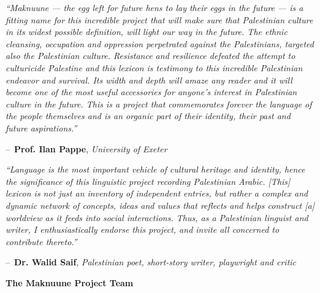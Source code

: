 \documentclass[11pt]{book}
\makeatletter
\newenvironment{chapquote}[2][2em]
  {\setlength{\@tempdima}{#1}%
   \def\chapquote@author{#2}%
   \parshape 1 \@tempdima \dimexpr\textwidth-2\@tempdima\relax%
   \itshape}
  {\par\normalfont\hfill--\ \chapquote@author\hspace*{\@tempdima}\par\bigskip}
\makeatother
\begin{document}
\vspace{5mm}

\begin{chapquote}{\textbf{Prof. Ilan Pappe}, \textit{University of Exeter}}
``Maknuune — the egg left for future hens to lay their eggs in the future — is a fitting name for this incredible project that will make sure that Palestinian culture in its widest possible definition, will light our way in the future. The ethnic cleansing, occupation and oppression perpetrated against the Palestinians, targeted also the Palestinian culture. Resistance and resilience defeated the attempt to culturicide Palestine and this lexicon is testimony to this incredible Palestinian endeavor and survival. Its width and depth will amaze any reader and it will become one of the most useful accessories for anyone's interest in Palestinian culture in the future. This is a project that commemorates forever the language of the people themselves and is an organic part of their identity, their past and future aspirations.''
\end{chapquote}

\vspace{5mm}

\begin{chapquote}{\textbf{Dr. Walid Saif}, \textit{Palestinian poet, short-story writer, playwright and critic}}
``Language is the most important vehicle of cultural heritage and identity, hence the significance of this linguistic project recording Palestinian Arabic. [This] lexicon is not just an inventory of independent entries, but rather a complex and dynamic network of concepts, ideas and values that reflects and helps construct [a] worldview as it feeds into social interactions. Thus, as a Palestinian linguist and writer, I enthusiastically endorse this project, and invite all concerned to contribute thereto.''

\end{chapquote}


\newpage
\thispagestyle{empty}
{\par\normalfont\fontsize{30}{30}\selectfont \textbf{The Maknuune Project Team}} \\
\vspace{3cm}
\end{document}
